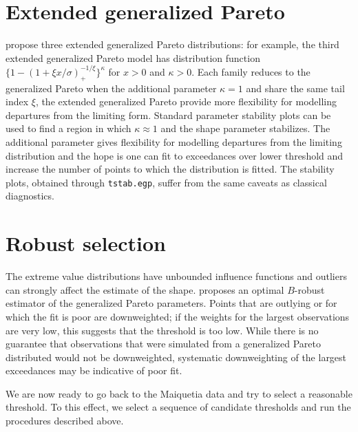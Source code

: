 \documentclass[]{book}
\begin{document}
\hypertarget{extended-generalized-pareto}{%
\section{Extended generalized Pareto}\label{extended-generalized-pareto}}

\citet{Papastathopoulos:2013} propose three extended generalized Pareto distributions: for example, the third extended generalized Pareto model has distribution function \(\{1-(1+\xi x/\sigma)^{-1/\xi}_{+}\}^{\kappa}\) for \(x >0\) and \(\kappa > 0\). Each family reduces to the generalized Pareto when the additional parameter \(\kappa=1\) and share the same tail index \(\xi\), the extended generalized Pareto provide more flexibility for modelling departures from the limiting form. Standard parameter stability plots can be used to find a region in which \(\kappa \approx 1\) and the shape parameter stabilizes. The additional parameter gives flexibility for modelling departures from the limiting distribution and the hope is one can fit to exceedances over lower threshold and increase the number of points to which the distribution is fitted. The stability plots, obtained through \texttt{tstab.egp}, suffer from the same caveats as classical diagnostics.

\hypertarget{robust-selection}{%
\section{Robust selection}\label{robust-selection}}

The extreme value distributions have unbounded influence functions and outliers can strongly affect the estimate of the shape. \citet{Dupuis:1999} proposes an optimal \(B\)-robust estimator of the generalized Pareto parameters. Points that are outlying or for which the fit is poor are downweighted; if the weights for the largest observations are very low, this suggests that the threshold is too low. While there is no guarantee that observations that were simulated from a generalized Pareto distributed would not be downweighted, systematic downweighting of the largest exceedances may be indicative of poor fit.

We are now ready to go back to the Maiquetia data and try to select a reasonable threshold. To this effect, we select a sequence of candidate thresholds and run the procedures described above.
\end{document}
